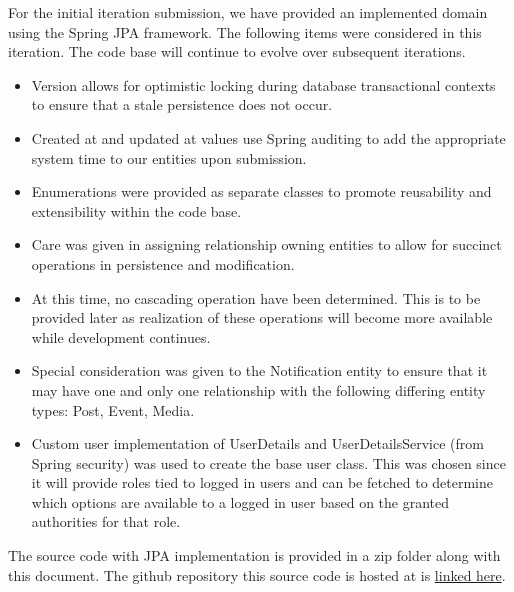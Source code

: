 For the initial iteration submission, we have provided an implemented domain using the
Spring JPA framework. The following items were considered in this iteration. The code base will continue to evolve over subsequent iterations.
\begin{itemize}
    \item Version allows for optimistic locking during database transactional contexts to ensure that a stale persistence does not occur.

    \item Created at and updated at values use Spring auditing to add the appropriate system time to our entities upon submission.

    \item Enumerations were provided as separate classes to promote reusability and extensibility within the code base.

    \item Care was given in assigning relationship owning entities to allow for succinct operations in persistence and modification.

    \item At this time, no cascading operation have been determined. This is to be provided later as realization of these operations will become more available while development continues.

    \item Special consideration was given to the Notification entity to ensure that it may have one and only one relationship with the following differing entity types: Post, Event, Media.

    \item Custom user implementation of UserDetails and UserDetailsService (from Spring security) was used to create the base user class. This was chosen since it will provide roles tied to logged in users and can be fetched to determine which options are available to a logged in user based on the granted authorities for that role.
\end{itemize}

The source code with JPA implementation is provided in a zip folder along with this document. The github repository this source code is hosted at is \href{https://github.com/tkm3d1a/cs5324_s24_class_project}{linked here}.
